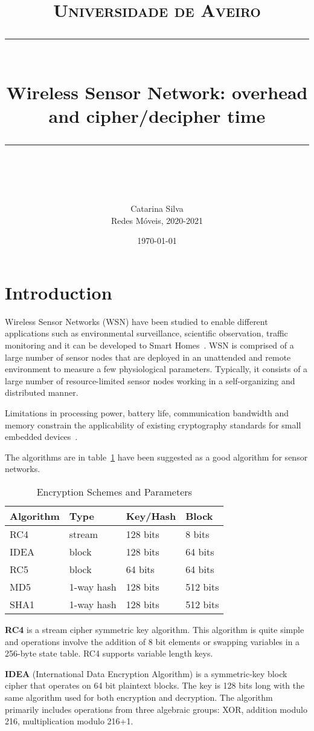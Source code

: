 \documentclass[11pt]{scrartcl} %
\title{	
	\normalfont\normalsize
	\textsc{Universidade de Aveiro}\\
	\vspace{25pt} %
	\rule{\linewidth}{0.5pt}\\ %
	\vspace{20pt} %
	{\huge Wireless Sensor Network: overhead and cipher/decipher time}\\ %
	\vspace{12pt} %
	\rule{\linewidth}{2pt}\\ %
	\vspace{12pt} %
}
\author{\LARGE Catarina Silva \\ \large Redes Móveis, 2020-2021} %
\date{\normalsize\today} %
\begin{document}
\maketitle %

\section{Introduction}

Wireless Sensor Networks (WSN) have been studied to enable different applications such as environmental surveillance, scientific observation, traffic monitoring and it can
be developed to Smart Homes~\cite{liu2009passive, 7029932}. WSN is comprised of a large number of sensor nodes that are deployed in an unattended and remote environment 
to measure a few physiological parameters. Typically, it consists of a large number of resource-limited sensor nodes working in a self-organizing and distributed manner.

Limitations in processing power, battery life, communication bandwidth and memory constrain the applicability of existing cryptography standards for small embedded 
devices~\cite{ganesan2003analyzing}.

The algorithms are in table~\ref{table:t00} have been suggested as a good algorithm for sensor networks. 

\begin{table}[h]
	\centering
	\caption{Encryption Schemes and Parameters}
	\label{table:t00}
	\begin{tabular}{llll}
		\toprule
		\textbf{Algorithm} & \textbf{Type} & \textbf{Key/Hash} & \textbf{Block} \\
		\midrule
		RC4 & stream & 128 bits & 8 bits \\
		IDEA & block & 128 bits & 64 bits \\
		RC5 & block & 64 bits & 64 bits \\
		MD5 & 1-way hash & 128 bits & 512 bits \\
		SHA1 & 1-way hash & 128 bits & 512 bits \\
		\bottomrule
	\end{tabular}
\end{table}

\textbf{RC4} is a stream cipher symmetric key algorithm. This algorithm is quite simple and operations involve the addition of 8 bit elements or swapping variables in a 256-byte 
state table. RC4 supports variable length keys.

\textbf{IDEA} (International Data Encryption Algorithm) is a symmetric-key block cipher that operates on 64 bit plaintext blocks. The key is 128 bits long with the same algorithm 
used for both encryption and decryption. The algorithm primarily includes operations from three algebraic groups: XOR, addition modulo 216, multiplication modulo 216+1.
\end{document}
